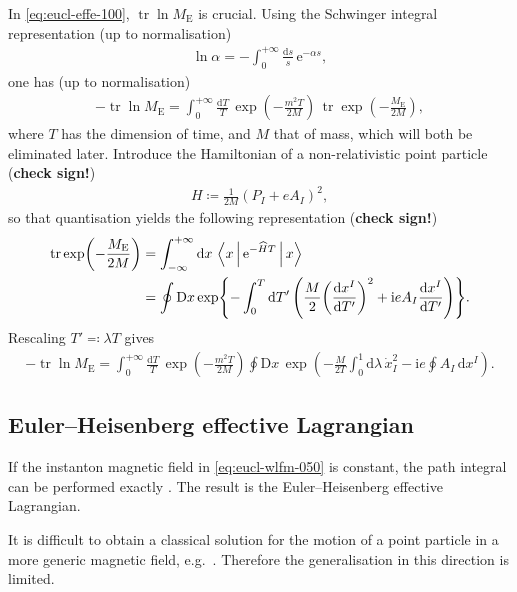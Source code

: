 \documentclass[12pt]{article}
\newcommand\mi{\mathrm{i}} %
\newcommand\me{\mathrm{e}} %
\newcommand\dif{\mathrm{d}}
\newcommand\Dif{\mathrm{D}}
\DeclareMathOperator{\tr}{tr}
\newcommand{\rbr}[1]{{\left(#1\right)}}
\newcommand{\rfun}[2]{{#1}\mathopen{}\left(#2\right)\mathclose{}}
\newcommand{\cfun}[2]{{#1}\mathopen{}\left\{#2\right\}\mathclose{}}
\newcommand{\frde}[2]{{\frac{\dif{#1}}{\dif{#2}}}}
\begin{document}
In \cref{eq:eucl-effe-100}, $\tr\ln M_\text{E}$ is crucial. Using the Schwinger 
integral representation \cite{Schwinger1951} (up to normalisation)
\begin{align}
\ln \alpha = -\int_0^{+\infty} \frac{\dif s}{s}\,\me^{-\alpha s},
\end{align}
one has (up to normalisation)
\begin{align}
- \tr\ln M_\text{E} = \int_0^{+\infty} \frac{\dif T}{T}\,
	\rfun{\exp}{-\frac{m^2 T}{2M}}\,
	\tr \rfun{\exp}{-\frac{M_\text{E}}{2M}},
\end{align}
where $T$ has the dimension of time, and $M$ that of mass, which will both be 
eliminated later. Introduce the Hamiltonian of a non-relativistic point particle 
(\textbf{check sign!})
\begin{align}
H \coloneqq \frac{1}{2M} \rbr{P_I + e A_I}^2,
\end{align}
so that quantisation yields the following representation (\textbf{check sign!})
\begin{align}
\tr \rfun{\exp}{-\frac{M_\text{E}}{2M}} &= \int_{-\infty}^{+\infty}\dif x\,
\Braket{x | \me^{-\widehat{H} T} | x}
\\
&= \oint \Dif x\,\cfun{\exp}{-\int_{0}^{T}\dif T'\,
	\rbr{\frac{M}{2} \rbr{\frde{x^I}{T'}}^2 + \mi e A_I \frde{x^I}{T'}}}.
\label{eq:eucl-wlfm-050}
\end{align}
Rescaling $T' \eqqcolon \lambda T$ gives
\begin{align}
- \tr\ln M_\text{E} = \int_{0}^{+\infty} \frac{\dif T}{T}\,
	\rfun{\exp}{-\frac{m^2 T}{2M}}
	\oint \Dif x\,
		\rfun{\exp}{-\frac{M}{2T} \int_{0}^{1} \dif \lambda\, \dot{x}_I^2
			- \mi e \oint A_I\,\dif x^I}.
\label{eq:eucl-wlfm-100}
\end{align}

\subsection{Euler--Heisenberg effective Lagrangian}
\label{ssec:eucl-ehel}

If the instanton magnetic field in \cref{eq:eucl-wlfm-050} is constant, the 
path integral can be performed exactly \cite{Feynman1965}. The result is the 
Euler--Heisenberg effective Lagrangian.

It is difficult to obtain a classical solution for the motion of a point 
particle in a more generic magnetic field, e.g.\ \cite{Kondo1964}. Therefore 
the generalisation in this direction is limited.
\end{document}
